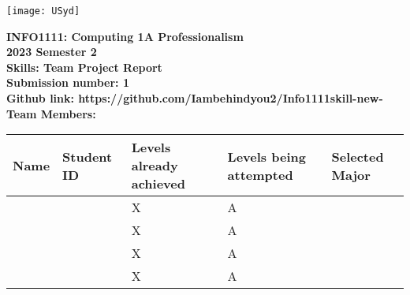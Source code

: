 \documentclass[a4paper, 11pt]{report}
\begin{document}
\begin{titlepage}
\begin{flushright}
\texttt{[image: USyd]}\\[2cm]
\end{flushright}
\center 
\textbf{\huge INFO1111: Computing 1A Professionalism}\\[0.75cm]
\textbf{\huge 2023 Semester 2}\\[2cm]
\textbf{\huge Skills: Team Project Report}\\[3cm]

\textbf{\huge Submission number: 1}\\[0.75cm]
\textbf{Github link: https://github.com/Iambehindyou2/Info1111skill-new-}\\[0.75cm]
\textbf{\huge Team Members:}\\[0.75cm]

\begin{tabular}{|p{}|p{}|p{}|p{}|p{}|}
	\hline
	Name & Student ID & \raggedright{Levels already achieved} & \raggedright{Levels being attempted} & Selected Major \\
	\hline
	\hline
	\raggedright{\studA} & \sidA & X & A& \majA \\
	\raggedright{\studB} & \sidB & X & A& \majB \\
	\raggedright{\studC} & \sidC & X & A & \majC \\
	\raggedright{\studD} & \sidD & X & A & \majD \\
	\hline
\end{tabular}
\thispagestyle{empty}
\end{titlepage}


\newpage
\end{document}
